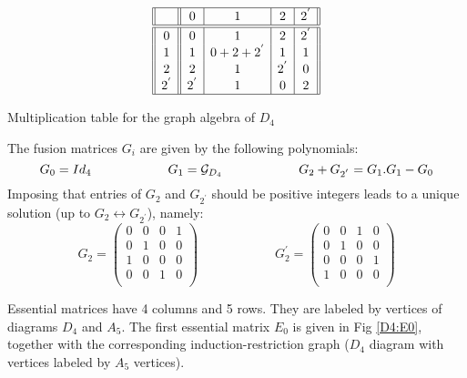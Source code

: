 \documentclass[a4paper,11pt]{article}
\begin{document}
\begin{table}[hhh]
$$
\begin{array}{||c||c|c|c|c||}
\hline
{}& 0 & 1  & 2 & 2^{'}   \\
\hline
\hline
0     & 0     & 1         & 2     & 2^{'}  \\
1     & 1     & 0+2+2^{'} & 1     & 1      \\
2     & 2     & 1         & 2^{'} & 0      \\
2^{'} & 2^{'} & 1         & 0     & 2      \\
\hline
\end{array}
$$
\caption{Multiplication table for the graph algebra of $D_4$ }
\end{table}
The fusion matrices $G_{i}$ are given by the following polynomials:
$$
G_0 = Id_4
\qquad \qquad \qquad
G_1 = {\cal G}_{D_4} \qquad \qquad \qquad
G_2 + G_{2^{'}} = G_1.G_1 - G_0
$$
Imposing that entries of $G_2$ and $G_{2^{'}}$ should be positive
integers leads to a unique solution (up to $G_2 \leftrightarrow
G_{2^{'}}$), namely:
$$
G_2 = \left( \begin{array}{cccc}
0 & 0 & 0 & 1 \\
0 & 1 & 0 & 0 \\
1 & 0 & 0 & 0 \\
0 & 0 & 1 & 0 \\
\end{array}
\right)
\qquad \qquad \qquad
G_2^{'} = \left( \begin{array}{cccc}
0 & 0 & 1 & 0 \\
0 & 1 & 0 & 0 \\
0 & 0 & 0 & 1 \\
1 & 0 & 0 & 0 \\
\end{array}
\right)
$$



Essential matrices have 4 columns and 5 rows. They are labeled
by vertices of diagrams $D_4$ and $A_{5}$. The first essential
matrix $E_0$ is given in Fig \ref{D4:E0}, together with the corresponding
induction-restriction graph ($D_4$ diagram with vertices labeled
by $A_5$ vertices).
\end{document}
